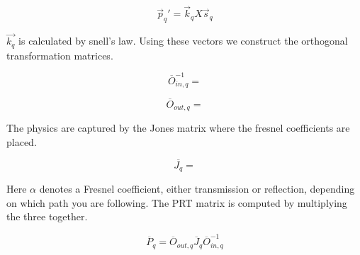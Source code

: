 \documentclass{article}
\begin{document}
	\begin{equation}
		\vec{p}_{q}' = \vec{k}_{q} X \vec{s}_{q} 
	\end{equation}
	
	$\vec{k_{q}}$ is calculated by snell's law. Using these vectors we construct the orthogonal transformation matrices.
	
	\begin{equation}
		\overline{O}_{in,q}^{-1} = 
	\end{equation}

	\begin{equation}
		\overline{O}_{out,q} = 
	\end{equation}

	The physics are captured by the Jones matrix where the fresnel coefficients are placed.
	
	\begin{equation}
		\overline{J_{q}} = 
	\end{equation} 

	Here $\alpha$ denotes a Fresnel coefficient, either transmission or reflection, depending on which path you are following. The PRT matrix is computed by multiplying the three together.
	
	\begin{equation}
		\overline{P}_{q} = \overline{O}_{out,q} \overline{J}_{q} \overline{O}_{in,q}^{-1}
	\end{equation}
\end{document}
